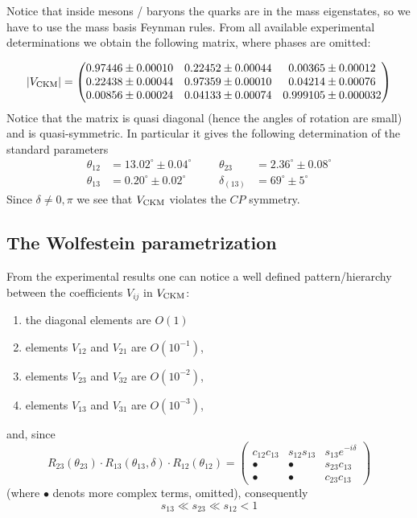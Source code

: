 \documentclass[TheoreticalPhy_ModB.tex]{subfiles}
\begin{document}
Notice that inside mesons / baryons the quarks are in the mass eigenstates, so we have to use the mass basis Feynman rules. 
From all available experimental determinations we obtain the following matrix, where phases are omitted:

\[\vert V_{\text{CKM}}\vert = \begin{pmatrix}0.97446\pm0.00010&0.22452\pm0.00044&0.00365\pm0.00012\\0.22438\pm0.00044&0.97359\pm0.00010&0.04214\pm0.00076\\0.00856\pm0.00024&0.04133\pm0.00074&0.999105\pm0.000032\end{pmatrix}\]
Notice that the matrix is quasi diagonal (hence the angles of rotation are small) and is quasi-symmetric. In particular it gives the following determination of the standard parameters
\[\begin{aligned}\theta_{12}&=13.02^\circ\pm0.04^\circ&&&\theta_{23}&=2.36^\circ\pm0.08^\circ\\
\theta_{13}&=0.20^\circ\pm0.02^\circ&&&\delta_{(13)}&=69^\circ\pm5^\circ\end{aligned}\]
Since $\delta\neq0,\pi$ we see that $V_{\text{CKM}}$ violates the $CP$ symmetry. 

\subsection{The Wolfestein parametrization}

From the experimental results one can notice a well defined pattern/hierarchy between the coefficients $V_{ij}$ in $V_{\text{CKM}}$:
\begin{enumerate}
	\item the diagonal elements are $O(1)$
	\item elements $V_{12}$ and $V_{21}$ are $O(10^{-1})$,
	\item elements $V_{23}$ and $V_{32}$ are $O(10^{-2})$,
	\item elements $V_{13}$ and $V_{31}$ are $O(10^{-3})$,
\end{enumerate}
and, since 
\[R_{23}(\theta_{23})\cdot R_{13}(\theta_{13},\delta)\cdot R_{12}(\theta_{12})=
\begin{pmatrix}c_{12}c_{13}&s_{12}s_{13}&s_{13}e^{-i\delta}\\
\bullet&\bullet&s_{23}c_{13}\\
\bullet&\bullet&c_{23}c_{13}\end{pmatrix}\]
(where $\bullet$ denots more complex terms, omitted), consequently
\[s_{13} \ll s_{23} \ll s_{12} < 1\]
\end{document}

